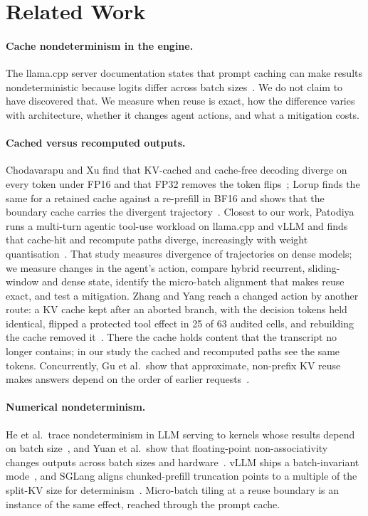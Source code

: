 \section{Related Work}
\label{sec:related}

\paragraph{Cache nondeterminism in the engine.}
The llama.cpp server documentation states that prompt caching can make results
nondeterministic because logits differ across batch
sizes~\cite{llamacpp-server}. We do not claim to have discovered that. We
measure when reuse is exact, how the difference varies with architecture,
whether it changes agent actions, and what a mitigation costs.

\paragraph{Cached versus recomputed outputs.}
Chodavarapu and Xu find that KV-cached and cache-free decoding diverge on every
token under FP16 and that FP32 removes the token flips~\cite{chodavarapu-fp16};
Lorup finds the same for a retained cache against a re-prefill in BF16 and
shows that the boundary cache carries the divergent
trajectory~\cite{lorup-stage-replay}. Closest to our work, Patodiya runs a
multi-turn agentic tool-use workload on llama.cpp and vLLM and finds that
cache-hit and recompute paths diverge, increasingly with weight
quantisation~\cite{patodiya-cache-divergence}. That study measures divergence
of trajectories on dense models; we measure changes in the agent's action,
compare hybrid recurrent, sliding-window and dense state, identify the
micro-batch alignment that makes reuse exact, and test a mitigation. Zhang and
Yang reach a changed action by another route: a KV cache kept after an
aborted branch, with the decision tokens held identical, flipped a protected
tool effect in 25 of 63 audited cells, and rebuilding the cache removed
it~\cite{zhang-rollback}. There the cache holds content that the transcript no
longer contains; in our study the cached and recomputed paths see the same
tokens. Concurrently, Gu et al.\ show that approximate, non-prefix KV reuse
makes answers depend on the order of earlier requests~\cite{gu-request-order}.

\paragraph{Numerical nondeterminism.}
He et al.\ trace nondeterminism in LLM serving to kernels whose results depend
on batch size~\cite{tml-nondeterminism}, and Yuan et al.\ show that
floating-point non-associativity changes outputs across batch sizes and
hardware~\cite{yuan-nondeterminism}. vLLM ships a batch-invariant
mode~\cite{vllm-batch-invariant}, and SGLang aligns chunked-prefill
truncation points to a multiple of the split-KV size for
determinism~\cite{sglang-deterministic}. Micro-batch tiling at a reuse boundary is an
instance of the same effect, reached through the prompt cache.

